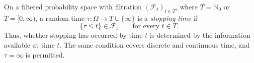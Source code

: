 
On a filtered probability space with filtration $(\mathcal F_t)_{t\in T}$, where $T=\mathbb N_0$ or $T=[0,\infty)$, a random time $\tau:\Omega\to T\cup\{\infty\}$ is a \emph{stopping time} if
\[
\{\tau\le t\}\in\mathcal F_t\qquad\text{for every }t\in T.
\]
Thus, whether stopping has occurred by time $t$ is determined by the information available at time $t$. The same condition covers discrete and continuous time, and $\tau=\infty$ is permitted.
